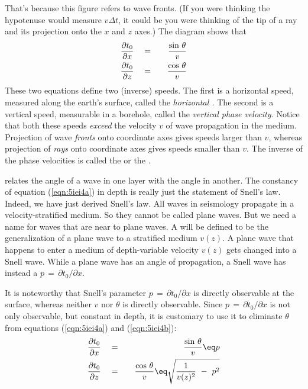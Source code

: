 That's because this figure refers to wave fronts.
(If you were thinking the hypotenuse would measure $v\Delta t$,
it could be you were thinking of the tip of a ray
and its projection onto the $x$ and $z$ axes.)
The diagram shows that
\begin{eqnarray}
{\partial t_0 \over \partial x} \ \ \ &=&\ \ \  { \sin \, \theta  \over v }
\label{eqn:5iei4a}
\\
{\partial t_0 \over \partial z} \ \ \ &=&\ \ \  { \cos \, \theta  \over v }
\label{eqn:5iei4b}
\end{eqnarray}
These two equations define two (inverse) speeds.
The first is a horizontal speed,
measured along the earth's surface,
called the
{\em 
horizontal .
}
The second is a vertical speed, measurable in a borehole, called the
{\em 
vertical phase velocity.
}
Notice that both these speeds
{\em  exceed}
the velocity  $v$  of wave propagation in the medium.
Projection of wave
{\em  fronts}
onto coordinate axes gives speeds larger than  $v$,
whereas projection of
{\em  rays}
onto coordinate axes gives speeds smaller than $v$.
The inverse of the phase velocities is called the
{\em  {}}
or the 
{\em  {}.}
\par
{} relates the angle of a wave
in one layer with the angle in another.
The constancy of equation (\ref{eqn:5iei4a}) in depth is really just
the statement of Snell's law.
Indeed, we have just derived Snell's law.
All waves in seismology propagate in a
velocity-stratified medium.  So they cannot be called
plane waves.  But we need a name for waves that are
near to plane waves.  A %
{\em  {} %
} will be defined to be the generalization of a plane wave
to a stratified medium  $v(z)$.
A plane wave that happens to enter a medium
of depth-variable velocity  $v(z)$  gets changed into a Snell wave.
While a plane wave has an angle of propagation, a
Snell wave has instead a %
{\em  {} %
} $p\,=\,{\partial t_0}/{\partial x}$.
\par
It is noteworthy that
Snell's parameter  $p\,=\,{\partial t_0}/{\partial x}$  is directly
observable at the surface,
whereas neither  $v$  nor  $\theta$  is directly observable.
Since  $p\,=\,{\partial t_0}/{\partial x}$  is not only observable,
but constant in depth, it is customary to use it
to eliminate  $\theta$  from equations (\ref{eqn:5iei4a}) and (\ref{eqn:5iei4b}):
\begin{eqnarray}
{\partial t_0  \over \partial x} \ \ \ &=&\ \ \ {\sin\,\theta  \over v }\eq p
\label{eqn:5iei5a}
\\
{\partial t_0  \over \partial z}\ \ \ &=&\ \ \ 
{\cos\,\theta  \over v }\eq \sqrt{
 {1 \over v (z)^2}\ -\ p^2  }
\label{eqn:5iei5b}
\end{eqnarray}

